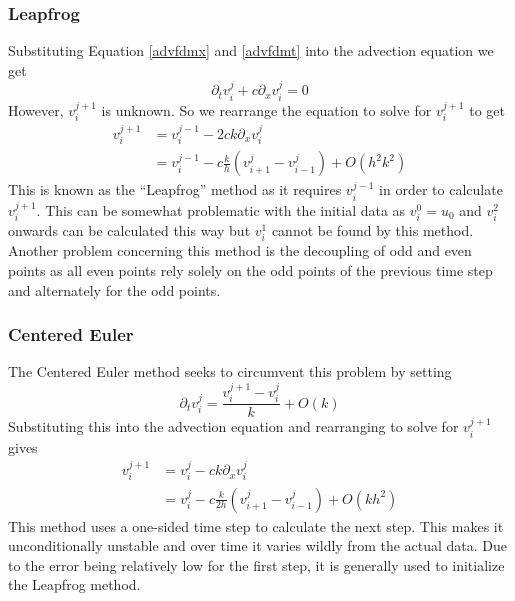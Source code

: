 \subsubsection{Leapfrog}
Substituting Equation \ref{advfdmx} and \ref{advfdmt} into the advection equation we get
\begin{equation}
  \partial_tv_i^j + c\partial_xv_i^j = 0
\end{equation}
However, $v_i^{j+1}$ is unknown. So we rearrange the equation to solve for $v_i^{j+1}$ to get
\begin{align*}
    v_i^{j+1} &= v_i^{j-1} - 2ck\partial_xv_i^j \\
	      &= v_i^{j-1} - c\frac{k}{h}(v_{i+1}^j - v_{i-1}^j) + O(h^2k^2)
\end{align*}
This is known as the ``Leapfrog'' method as it requires $v_i^{j-1}$ in order to calculate $v_i^{j+1}$. This can be somewhat problematic with the initial data as $v_i^0=u_0$ and $v_i^2$ onwards can be calculated this way but $v_i^1$ cannot be found by this method. Another problem concerning this method is the decoupling of odd and even points as all even points rely solely on the odd points of the previous time step and alternately for the odd points.
\subsubsection{Centered Euler}
The Centered Euler method seeks to circumvent this problem by setting
\begin{equation}
\partial_tv_i^j = \frac{v_i^{j+1} - v_i^j}{k} + O(k)
\end{equation}
Substituting this into the advection equation and rearranging to solve for $v_i^{j+1}$ gives
\begin{align*}
    v_i^{j+1} &= v_i^j - ck\partial_xv_i^j \\
	      &= v_i^j - c\frac{k}{2h}(v_{i+1}^j - v_{i-1}^j) + O(kh^2)
\end{align*}
This method uses a one-sided time step to calculate the next step. This makes it unconditionally unstable and over time it varies wildly from the actual data. Due to the error being relatively low for the first step, it is generally used to initialize the Leapfrog method.
